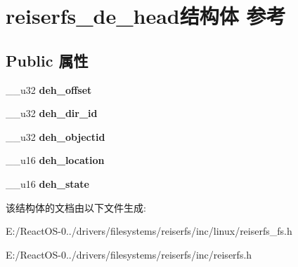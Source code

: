 \hypertarget{structreiserfs__de__head}{}\section{reiserfs\+\_\+de\+\_\+head结构体 参考}
\label{structreiserfs__de__head}
\subsection*{Public 属性}
\begin{DoxyCompactItemize}
\item 
\mbox{\label{structreiserfs__de__head_abd1dcbd1f8490042e04242ff698cbb11}} 
\+\_\+\+\_\+u32 {\bfseries deh\+\_\+offset}
\item 
\mbox{\label{structreiserfs__de__head_a6587d453be7d119e844fd9cff0be9c98}} 
\+\_\+\+\_\+u32 {\bfseries deh\+\_\+dir\+\_\+id}
\item 
\mbox{\label{structreiserfs__de__head_a4d9811ba4ebd6234b41491153eedd392}} 
\+\_\+\+\_\+u32 {\bfseries deh\+\_\+objectid}
\item 
\mbox{\label{structreiserfs__de__head_ac11b82f7d9a695a58aa2567764beb2e8}} 
\+\_\+\+\_\+u16 {\bfseries deh\+\_\+location}
\item 
\mbox{\label{structreiserfs__de__head_ae5ce41fb0a0768c51ae69f753f77fb1e}} 
\+\_\+\+\_\+u16 {\bfseries deh\+\_\+state}
\end{DoxyCompactItemize}


该结构体的文档由以下文件生成\+:\begin{DoxyCompactItemize}
\item 
E\+:/\+React\+O\+S-\/0../drivers/filesystems/reiserfs/inc/linux/reiserfs\+\_\+fs.\+h\item 
E\+:/\+React\+O\+S-\/0../drivers/filesystems/reiserfs/inc/reiserfs.\+h\end{DoxyCompactItemize}
